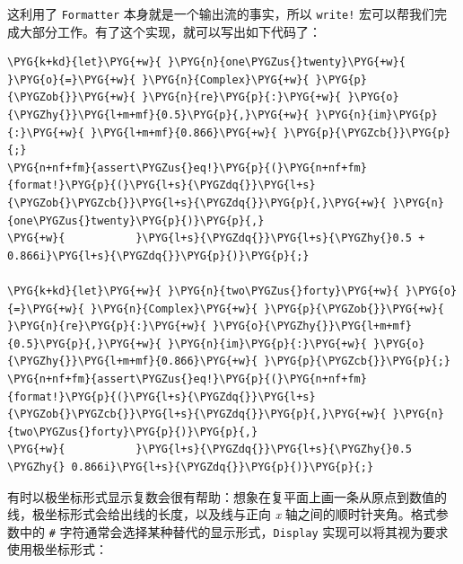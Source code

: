 这利用了 \texttt{Formatter} 本身就是一个输出流的事实，所以 \texttt{write!} 宏可以帮我们完成大部分工作。有了这个实现，就可以写出如下代码了：

\begin{Verbatim}[commandchars=\\\{\},breaklines=true,breakanywhere=true,fontsize=\codefont,xleftmargin=17bp]
\PYG{k+kd}{let}\PYG{+w}{ }\PYG{n}{one\PYGZus{}twenty}\PYG{+w}{ }\PYG{o}{=}\PYG{+w}{ }\PYG{n}{Complex}\PYG{+w}{ }\PYG{p}{\PYGZob{}}\PYG{+w}{ }\PYG{n}{re}\PYG{p}{:}\PYG{+w}{ }\PYG{o}{\PYGZhy{}}\PYG{l+m+mf}{0.5}\PYG{p}{,}\PYG{+w}{ }\PYG{n}{im}\PYG{p}{:}\PYG{+w}{ }\PYG{l+m+mf}{0.866}\PYG{+w}{ }\PYG{p}{\PYGZcb{}}\PYG{p}{;}
\PYG{n+nf+fm}{assert\PYGZus{}eq!}\PYG{p}{(}\PYG{n+nf+fm}{format!}\PYG{p}{(}\PYG{l+s}{\PYGZdq{}}\PYG{l+s}{\PYGZob{}\PYGZcb{}}\PYG{l+s}{\PYGZdq{}}\PYG{p}{,}\PYG{+w}{ }\PYG{n}{one\PYGZus{}twenty}\PYG{p}{)}\PYG{p}{,}
\PYG{+w}{           }\PYG{l+s}{\PYGZdq{}}\PYG{l+s}{\PYGZhy{}0.5 + 0.866i}\PYG{l+s}{\PYGZdq{}}\PYG{p}{)}\PYG{p}{;}

\PYG{k+kd}{let}\PYG{+w}{ }\PYG{n}{two\PYGZus{}forty}\PYG{+w}{ }\PYG{o}{=}\PYG{+w}{ }\PYG{n}{Complex}\PYG{+w}{ }\PYG{p}{\PYGZob{}}\PYG{+w}{ }\PYG{n}{re}\PYG{p}{:}\PYG{+w}{ }\PYG{o}{\PYGZhy{}}\PYG{l+m+mf}{0.5}\PYG{p}{,}\PYG{+w}{ }\PYG{n}{im}\PYG{p}{:}\PYG{+w}{ }\PYG{o}{\PYGZhy{}}\PYG{l+m+mf}{0.866}\PYG{+w}{ }\PYG{p}{\PYGZcb{}}\PYG{p}{;}
\PYG{n+nf+fm}{assert\PYGZus{}eq!}\PYG{p}{(}\PYG{n+nf+fm}{format!}\PYG{p}{(}\PYG{l+s}{\PYGZdq{}}\PYG{l+s}{\PYGZob{}\PYGZcb{}}\PYG{l+s}{\PYGZdq{}}\PYG{p}{,}\PYG{+w}{ }\PYG{n}{two\PYGZus{}forty}\PYG{p}{)}\PYG{p}{,}
\PYG{+w}{           }\PYG{l+s}{\PYGZdq{}}\PYG{l+s}{\PYGZhy{}0.5 \PYGZhy{} 0.866i}\PYG{l+s}{\PYGZdq{}}\PYG{p}{)}\PYG{p}{;}
\end{Verbatim}

有时以极坐标形式显示复数会很有帮助：想象在复平面上画一条从原点到数值的线，极坐标形式会给出线的长度，以及线与正向 \emph{x} 轴之间的顺时针夹角。格式参数中的 \texttt{\#} 字符通常会选择某种替代的显示形式，\texttt{Display} 实现可以将其视为要求使用极坐标形式：

